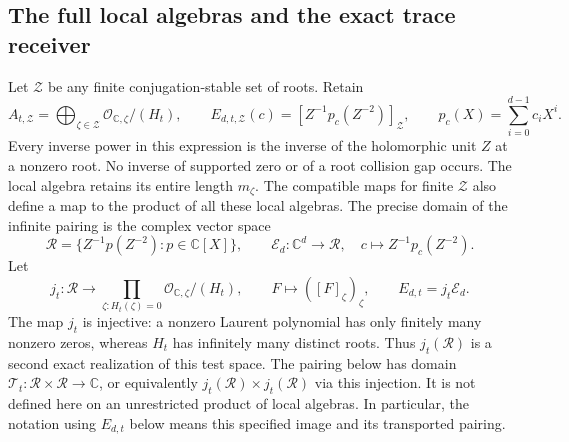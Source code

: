 \subsection{The full local algebras and the exact trace receiver}

Let $\mathcal Z$ be any finite conjugation-stable set of roots. Retain
\begin{equation}\tag{ALM5}
 A_{t,\mathcal Z}=\bigoplus_{\zeta\in\mathcal Z}
       \mathcal O_{\mathbb C,\zeta}/(H_t),\qquad
 E_{d,t,\mathcal Z}(c)=
 \left[Z^{-1}p_c(Z^{-2})\right]_{\mathcal Z},\qquad
 p_c(X)=\sum_{i=0}^{d-1}c_iX^i.
\end{equation}
Every inverse power in this expression is the inverse of the
holomorphic unit $Z$ at a nonzero root. No inverse of supported zero
or of a root collision gap occurs. The local algebra retains its
entire length $m_\zeta$. The compatible maps for finite $\mathcal Z$
also define a map to the product of all these local algebras.
The precise domain of the infinite pairing is the complex vector space
\[
 \mathscr R=\{Z^{-1}p(Z^{-2}):p\in\mathbb C[X]\},\qquad
 \mathcal E_d:\mathbb C^d\longrightarrow\mathscr R,
 \quad c\longmapsto Z^{-1}p_c(Z^{-2}).
\]
Let
\[
 j_t:\mathscr R\longrightarrow
        \prod_{\zeta:H_t(\zeta)=0}\mathcal O_{\mathbb C,\zeta}/(H_t),
 \qquad F\longmapsto([F]_\zeta)_\zeta,
 \qquad E_{d,t}=j_t\mathcal E_d.
\]
The map $j_t$ is injective: a nonzero Laurent polynomial has only
finitely many nonzero zeros, whereas $H_t$ has infinitely many
distinct roots. Thus $j_t(\mathscr R)$ is a second exact realization
of this test space. The pairing below has domain
$\mathcal T_t:\mathscr R\times\mathscr R\to\mathbb C$, or equivalently
$j_t(\mathscr R)\times j_t(\mathscr R)$ via this injection. It is not
defined here on an unrestricted product of local algebras. In
particular, the notation using $E_{d,t}$ below means this specified
image and its transported pairing.

